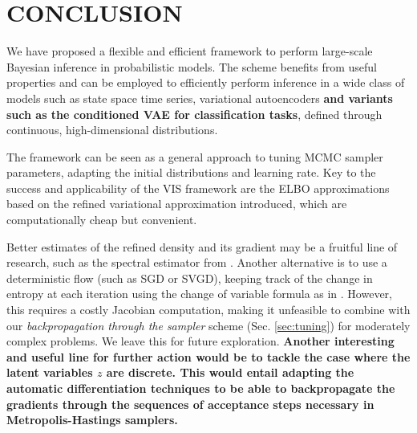 
\section{CONCLUSION}

We have proposed a flexible and efficient framework to perform
large-scale Bayesian inference in probabilistic models. The scheme benefits from useful properties and can be 
employed to efficiently perform inference in a wide class of models such as state space time series, variational autoencoders {\bf and variants such as the conditioned VAE for classification tasks}, defined through continuous, high-dimensional distributions.

The framework can be seen as a general 
approach to tuning MCMC sampler parameters, adapting the initial distributions and learning rate. %
Key to the success and applicability of the VIS framework are the ELBO approximations based on the refined variational approximation introduced, which are computationally cheap but convenient. 

Better estimates of the refined density and its gradient may be a fruitful line of research, such as the spectral estimator from \cite{shi2018spectral}. Another alternative is to use a deterministic flow (such as SGD or SVGD), keeping
track of the change in entropy at each iteration using the change of variable formula as  in \cite{duvenaud2016early}. However, this requires a costly Jacobian computation, making it unfeasible to combine with our \emph{backpropagation through the sampler} scheme (Sec. \ref{sec:tuning}) for moderately complex problems. We leave this for future exploration. {\bf Another interesting and useful line for further action would be to tackle the case where the latent variables $z$ are discrete. This would entail adapting the automatic differentiation techniques to be able to backpropagate the gradients through the sequences of acceptance steps necessary in Metropolis-Hastings samplers.}

